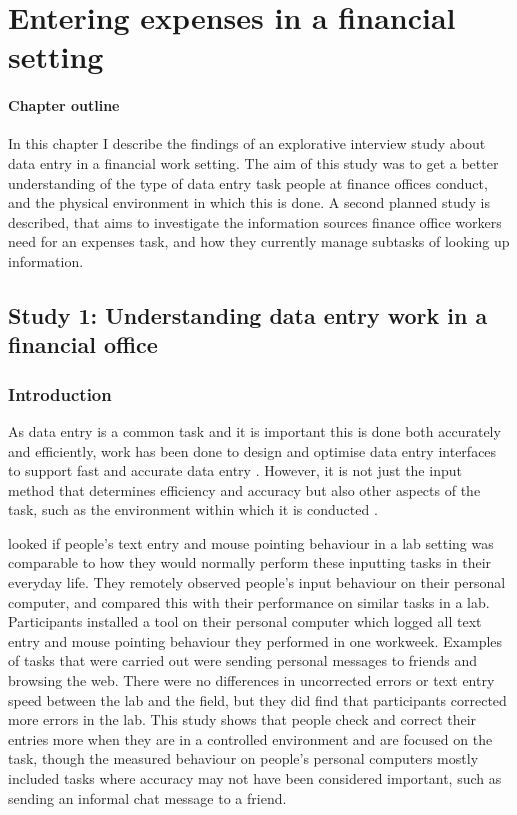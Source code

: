\chapter{Entering expenses in a financial setting}\label{ch:Study1}
\begin{mynote}
\subsubsection{Chapter outline}

In this chapter I describe the findings of an explorative interview study about data entry in a financial work setting. The aim of this study was to get a better understanding of the type of data entry task people at finance offices conduct, and the physical environment in which this is done.
A second planned study is described, that aims to investigate the information sources finance office workers need for an expenses task, and how they currently manage subtasks of looking up information.

\end{mynote}

\section{Study 1: Understanding data entry work in a financial office}\label{ch:Study1}
 
\subsection{Introduction}
As data entry is a common task and it is important this is done both accurately and efficiently, work has been done to design and optimise data entry interfaces to support fast and accurate data entry \citep[e.g.][]{Oladimeji2013, Vertanen2015, Wiseman2013a}.
However, it is not just the input method that determines efficiency and accuracy but also other aspects of the task, such as the environment within which it is conducted \citep{Payne2013, Randall2014}.

\citet{Evans2012} looked if people's text entry and mouse pointing behaviour in a lab setting was comparable to how they would normally perform these inputting tasks in their everyday life. They remotely observed people's input behaviour on their personal computer, and compared this with their performance on similar tasks in a lab. Participants installed a tool on their personal computer which logged all text entry and mouse pointing behaviour they performed in one workweek. Examples of tasks that were carried out were sending personal messages to friends and browsing the web. There were no differences in uncorrected errors or text entry speed between the lab and the field, but they did find that participants corrected more errors in the lab. This study shows that people check and correct their entries more when they are in a controlled environment and are focused on the task, though the measured behaviour on people's personal computers mostly included tasks where accuracy may not have been considered important, such as sending an informal chat message to a friend. 

